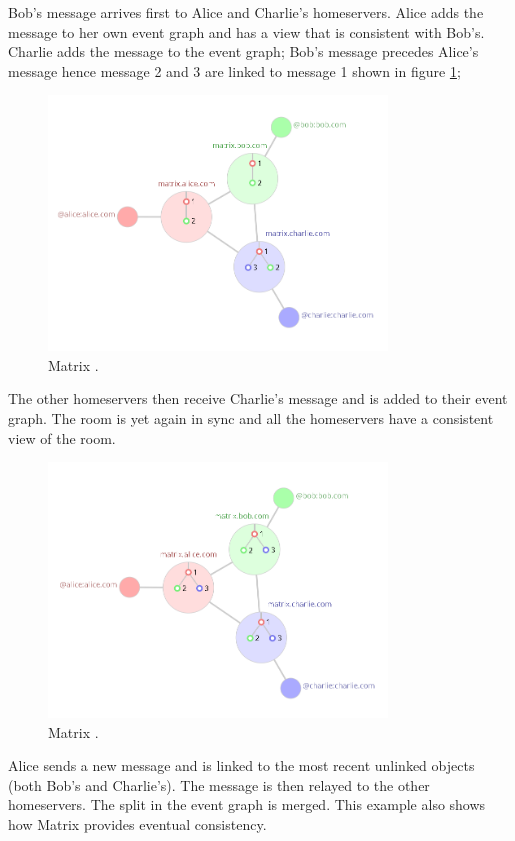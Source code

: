 Bob's message arrives first to Alice and Charlie's homeservers. Alice adds the message to her own event graph and has a view that is consistent with Bob's. Charlie adds the message to the event graph; Bob's message precedes Alice's message hence message 2 and 3 are linked to message 1 shown in figure \ref{fig:matrix3};


\begin{figure}[H]
	\centering
	\includegraphics[width=9cm]{figures/matrix3.png}
	\caption{ Matrix \cite{matrixhome}.}
	\label{fig:matrix3}
\end{figure}

 
The other homeservers then receive Charlie's message and is added to their event graph. The room is yet again in sync and all the homeservers have a consistent view of the room.


\begin{figure}[H]
	\centering
	\includegraphics[width=9cm]{figures/matrix4.png}
	\caption{ Matrix \cite{matrixhome}.}
	\label{fig:matrix4}
\end{figure}

Alice sends a new message and is linked to the most recent unlinked objects (both Bob's and Charlie's). The message is then relayed to the other homeservers. The split in the event graph is merged. This example also shows how Matrix provides eventual consistency.

